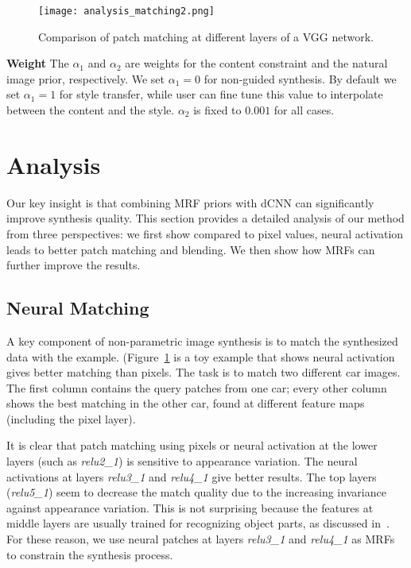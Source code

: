 \documentclass[10pt,twocolumn,letterpaper]{article}
\begin{document}
\begin{figure}[t]
	\centering
	\texttt{[image: analysis\_matching2.png]}
	\caption{Comparison of patch matching at different layers of a VGG network.}\label{fig:analysis_matching}
\end{figure}

\textbf{Weight} The $\alpha_{1}$ and $\alpha_{2}$ are weights for the content constraint and the natural image prior, respectively. We set $\alpha_{1} = 0$ for non-guided synthesis. By default we set $\alpha_{1} = 1$ for style transfer, while user can fine tune this value to interpolate between the content and the style. $\alpha_{2}$ is fixed to $0.001$ for all cases.

\section{Analysis}
Our key insight is that combining MRF priors with dCNN can significantly improve synthesis quality. This section provides a detailed analysis of our method from three perspectives: we first show compared to pixel values, neural activation leads to better patch matching and blending. We then show how MRFs can further improve the results.

\subsection{Neural Matching}
A key component of non-parametric image synthesis is to match the synthesized data with the example. (Figure~\ref{fig:analysis_matching} is a toy example that shows neural activation gives better matching than pixels. The task is to match two different car images. The first column contains the query patches from one car; every other column shows the best matching in the other car, found at different feature maps (including the pixel layer).

It is clear that patch matching using pixels or neural activation at the lower layers (such as \textit{relu2\_1}) is sensitive to appearance variation. The neural activations at layers \textit{relu3\_1} and \textit{relu4\_1} give better results. The top layers (\textit{relu5\_1}) seem to decrease the match quality due to the increasing invariance against appearance variation. This is not surprising because the features at middle layers are usually trained for recognizing object parts, as discussed in~\cite{Zeiler14}. For these reason, we use neural patches at layers \textit{relu3\_1} and \textit{relu4\_1} as MRFs to constrain the synthesis process.
\end{document}
